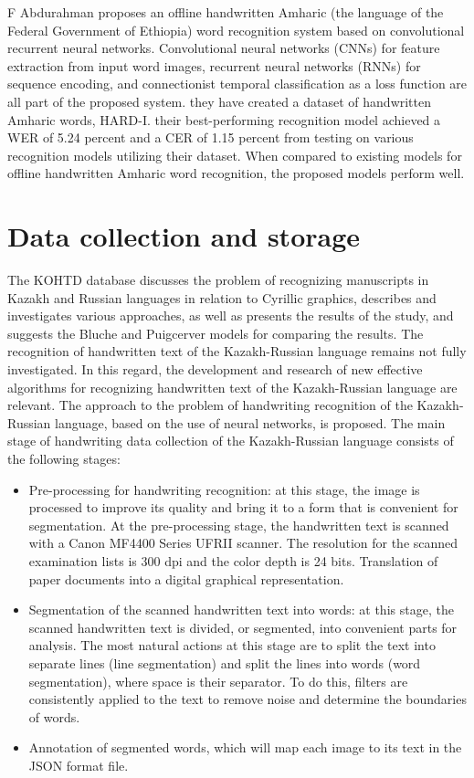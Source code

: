 \documentclass[preprint,12pt]{elsarticle}
\begin{document}
F Abdurahman \cite{abdurahman2021ahwr}  proposes an offline handwritten Amharic (the language of the Federal Government of Ethiopia) word recognition system based on convolutional recurrent neural networks. Convolutional neural networks (CNNs) for feature extraction from input word images, recurrent neural networks (RNNs) for sequence encoding, and connectionist temporal classification as a loss function are all part of the proposed system. they have created a dataset of handwritten Amharic words, HARD-I. their best-performing recognition model achieved a WER of 5.24 percent and a CER of 1.15 percent from testing on various recognition models utilizing their dataset. When compared to existing models for offline handwritten Amharic word recognition, the proposed models perform well.



\section{Data collection and storage}
\label{section:storage}
The KOHTD database discusses the problem of recognizing manuscripts in Kazakh and Russian languages in relation to Cyrillic graphics, describes and investigates various approaches, as well as presents the results of the study, and suggests the Bluche and Puigcerver models \cite{bluche2017gated, puigcerver2017multidimensional} for comparing the results. The recognition of handwritten text of the Kazakh-Russian language remains not fully investigated. In this regard, the development and research of new effective algorithms for recognizing handwritten text of the Kazakh-Russian language are relevant.
The approach to the problem of handwriting recognition of the Kazakh-Russian language, based on the use of neural networks, is proposed. The main stage of handwriting data collection of the Kazakh-Russian language consists of the following stages:
\begin{itemize}

    \item  Pre-processing for handwriting recognition: at this stage, the image is processed to improve its quality and bring it to a form that is convenient for segmentation. At the pre-processing stage, the handwritten text is scanned with a Canon MF4400 Series UFRII scanner. The resolution for the scanned examination lists is 300 dpi and the color depth is 24 bits. Translation of paper documents into a digital graphical representation. 
    \item  Segmentation of the scanned handwritten text into words: at this stage, the scanned handwritten text is divided, or segmented, into convenient parts for analysis. The most natural actions at this stage are to split the text into separate lines (line segmentation) and split the lines into words (word segmentation), where space is their separator.  To do this, filters are consistently applied to the text to remove noise and determine the boundaries of words.
    
    \item  Annotation of segmented words, which will map each image to its text in the JSON format file.
\end{itemize}
\end{document}
